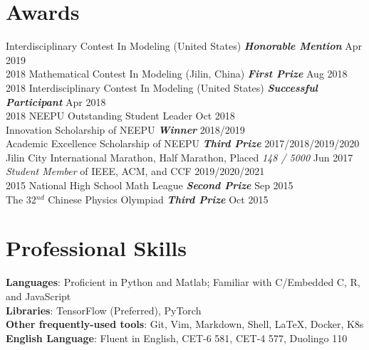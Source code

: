 \documentclass{my_cv}
\begin{document}
\hspace*{\fill} 

\section{Awards}
 Interdisciplinary Contest In Modeling (United States) \textbf{\emph{Honorable Mention}} \hfill Apr 2019\\
2018 Mathematical Contest In Modeling (Jilin, China) \textbf{\emph{First Prize}} \hfill Aug 2018\\
2018 Interdisciplinary Contest In Modeling (United States) \textbf{\emph{Successful Participant}} \hfill Apr 2018\\
2018 NEEPU Outstanding Student Leader \hfill Oct 2018\\
Innovation Scholarship of NEEPU \textbf{\emph{Winner}} \hfill 2018/2019\\
Academic Excellence Scholarship of NEEPU \textbf{\emph{Third Prize}} \hfill 2017/2018/2019/2020 \\
Jilin City International Marathon, Half Marathon, Placed \emph{148 / 5000} \hfill Jun 2017\\
\emph{Student Member} of IEEE, ACM, and CCF \hfill 2019/2020/2021\\
2015 National High School Math League \textbf{\emph{Second Prize}} \hfill Sep 2015\\
The 32$^{nd}$ Chinese Physics Olympiad \textbf{\emph{Third Prize}} \hfill Oct 2015

\hspace*{\fill}

\section{Professional Skills}
\noindent \textbf{Languages}: Proficient in Python and Matlab; Familiar with C/Embedded C, R, and JavaScript \\
\textbf{Libraries}: TensorFlow (Preferred), PyTorch \\
\textbf{Other frequently-used tools}: Git, Vim, Markdown, Shell, \LaTeX, Docker, K8s \\
\textbf{English Language}: Fluent in English, CET-6 581, CET-4 577, Duolingo 110
\end{document}
